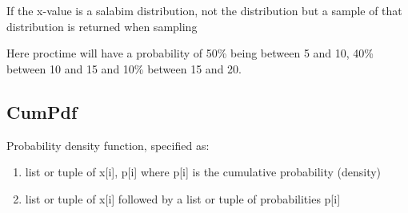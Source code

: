 \documentclass[letterpaper,10pt,english]{sphinxmanual}
\begin{document}
\begin{sphinxVerbatim}[commandchars=\\\{\}]
       
  
\end{sphinxVerbatim}

If the x-value is a salabim distribution, not the distribution but a sample of that distribution is returned when sampling

\begin{sphinxVerbatim}[commandchars=\\\{\}]
          
\end{sphinxVerbatim}

Here proctime will have a probability of 50\% being between 5 and 10, 40\% between 10 and 15 and 10\% between 15 and 20.


\subsection{CumPdf}
\label{\detokenize{Distributions:cumpdf}}
Probability density function, specified as:
\begin{enumerate}
\item {} 
list or tuple of x{[}i{]}, p{[}i{]} where p{[}i{]} is the cumulative probability (density)

\item {} 
list or tuple of x{[}i{]} followed by a list or tuple of probabilities p{[}i{]}

\end{enumerate}
\end{document}
